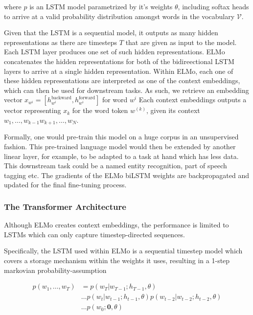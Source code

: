 \documentclass[a4paper,12pt,twoside,openright]{report}
\begin{document}
where $p$ is an LSTM model parametrized by it's weights $\theta$, including softax heads to arrive at a valid probability distribution amongst words in the vocabulary $\mathcal{V}$.

Given that the LSTM is a sequential model, it outputs as many hidden representations as there are timesteps $T$ that are given as input to the model. 
Each LSTM layer produces one set of such hidden representations.
ELMo concatenates the hidden representations for both of the bidireectional LSTM layers to arrive at a single hidden representation.
Within ELMo, each one of these hidden representations are interpreted as one of the context embeddings, which can then be used for downstream tasks.
As such, we retrieve an embedding vector $x_{w^i} = [h^\text{backward}_{w^i}, h^\text{forward}_{w^i}]$ for word $w^i$
Each context embeddings outputs a vector representing $x_{k}$ for the word token $w^{(k)}$, given its context $ w_{1}, \ldots, w_{k-1}  w_{k+1}, \ldots, w_{N}$.


Formally, one would pre-train this model on a huge corpus in an unsupervised fashion.
This pre-trained language model would then be extended by another linear layer, for example, to be adapted to a task at hand which has less data.
This downstream task could be a named entity recognition, part of speech tagging etc.
The gradients of the ELMo biLSTM weights are backpropagated and updated for the final fine-tuning process.


\subsubsection{The Transformer Architecture}

Although ELMo creates context embeddings, the performance is limited to LSTMs which can only capture timestep-directed sequences.

Specifically, the LSTM used within ELMo is a sequential timestep model which covers a storage mechanism within the weights it uses, resulting  in a 1-step markovian probability-assumption

\begin{align}
p(w_1, \ldots, w_T) &= p(w_T | w_{T-1}; h_{T-1}, \theta) \nonumber  \\
& \ldots p(w_t | w_{t-1}; h_{t-1}, \theta) p(w_{t-2} | w_{t-2}; h_{t-2}, \theta) \nonumber \\
& \ldots p(w_0 ; \mathbf{0}, \theta) 
\end{align}
\end{document}
